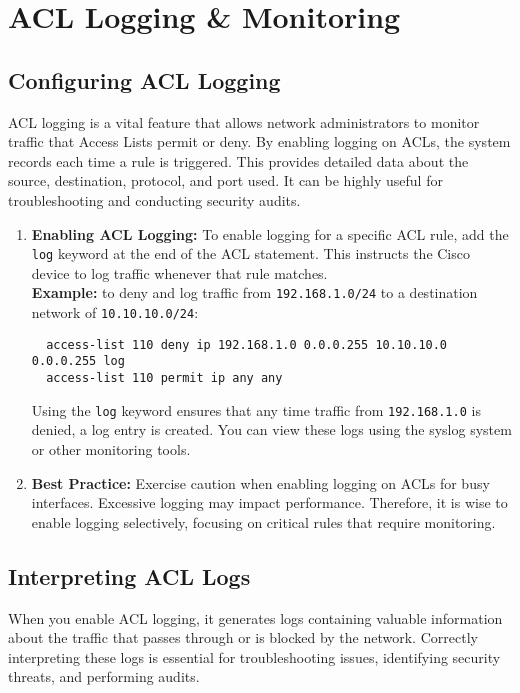 \documentclass[11pt,a4paper]{article}
\begin{document}
\section*{ACL Logging \& Monitoring}
            \subsection*{Configuring ACL Logging}
            ACL logging is a vital feature that allows network administrators to monitor traffic that Access Lists permit or deny. By enabling logging on ACLs, the system records each time a rule is triggered. This provides detailed data about the source, destination, protocol, and port used. It can be highly useful for troubleshooting and conducting security audits.

            \begin{enumerate}
                \item \textbf{Enabling ACL Logging:} To enable logging for a specific ACL rule, add the \lstinline{log} keyword at the end of the ACL statement. This instructs the Cisco device to log traffic whenever that rule matches.
                \\[1em]
                \textbf{Example:} to deny and log traffic from \lstinline{192.168.1.0/24} to a destination network of \lstinline{10.10.10.0/24}:
\begin{lstlisting}
  access-list 110 deny ip 192.168.1.0 0.0.0.255 10.10.10.0 0.0.0.255 log
  access-list 110 permit ip any any                                                                                              
\end{lstlisting}
                Using the \lstinline{log} keyword ensures that any time traffic from \lstinline{192.168.1.0} is denied, a log entry is created. You can view these logs using the syslog system or other monitoring tools.


                \item \textbf{Best Practice:} Exercise caution when enabling logging on ACLs for busy interfaces. Excessive logging may impact performance. Therefore, it is wise to enable logging selectively, focusing on critical rules that require monitoring.

            \end{enumerate}
    \subsection*{Interpreting ACL Logs}
        When you enable ACL logging, it generates logs containing valuable information about the traffic that passes through or is blocked by the network. Correctly interpreting these logs is essential for troubleshooting issues, identifying security threats, and performing audits.
\end{document}
